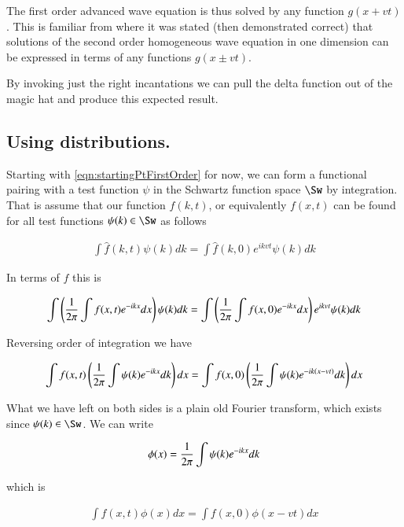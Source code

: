 The first order advanced wave equation is thus solved by any function $g(x + vt)$.  This
is familiar from
\cite{french1971vaw} where it was stated (then demonstrated correct) that solutions of the second
order homogeneous wave equation in one dimension can be expressed in terms of any functions
$g(x \pm vt)$.

By invoking just the right incantations we can pull the delta function out of the magic hat and 
produce this expected result.

\subsection{Using distributions. }

Starting with \ref{eqn:startingPtFirstOrder} for now, we can form a functional pairing with a test function $\psi$ in the Schwartz function space $\Sw$ by integration.  That is
assume that our function $\hat{f}(k,t)$, or equivalently $f(x,t)$ can be found for all test functions $\psi(k) \in \Sw$ as follows

\begin{align*}
\int {\hat{f}}(k,t) \psi(k) dk = \int \hat{f}(k,0) e^{i k v t} \psi(k) dk
\end{align*}

In terms of $f$ this is

\begin{align*}
\int \left( \frac{1}{2\pi} \int f(x,t) e^{-i k x} dx \right) \psi(k) dk = \int \left(\frac{1}{2\pi} \int f(x,0) e^{-i k x} dx \right) e^{i k v t} \psi(k) dk
\end{align*}

Reversing order of integration we have

\begin{align*}
\int f(x,t) \left( \frac{1}{2\pi} \int \psi(k) e^{-i k x} dk \right) dx = \int f(x,0) \left(\frac{1}{2\pi} \int \psi(k) e^{-i k (x - v t)} dk \right) dx
\end{align*}

What we have left on both sides is a plain old Fourier transform, which exists since $\psi(k) \in \Sw$. We can write

\begin{align*}
\phi(x) = \frac{1}{2\pi} \int \psi(k) e^{-i k x} dk 
\end{align*}

which is

\begin{align*}
\int f(x,t) \phi(x) dx = \int f(x,0) \phi(x - vt) dx
\end{align*}

